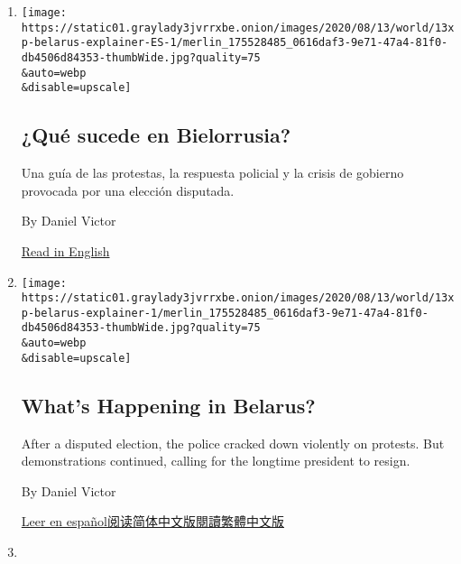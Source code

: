\begin{enumerate}
\def\labelenumi{\arabic{enumi}.}
\item
  \href{/es/2020/08/13/espanol/mundo/protestas-bielorrusia.html}{}

  \texttt{[image: https://static01.graylady3jvrrxbe.onion/images/2020/08/13/world/13xp-belarus-explainer-ES-1/merlin\_175528485\_0616daf3-9e71-47a4-81f0-db4506d84353-thumbWide.jpg?quality=75\\\&auto=webp\\\&disable=upscale]}

  \hypertarget{quuxe9-sucede-en-bielorrusia}{%
  \subsection{¿Qué sucede en
  Bielorrusia?}\label{quuxe9-sucede-en-bielorrusia}}

  Una guía de las protestas, la respuesta policial y la crisis de
  gobierno provocada por una elección disputada.

  By Daniel Victor

  \href{https://www.nytimes3xbfgragh.onion/2020/08/13/world/europe/belarus-protests-guide.html}{Read
  in English}
\item
  \href{/2020/08/13/world/europe/belarus-protests-guide.html}{}

  \texttt{[image: https://static01.graylady3jvrrxbe.onion/images/2020/08/13/world/13xp-belarus-explainer-1/merlin\_175528485\_0616daf3-9e71-47a4-81f0-db4506d84353-thumbWide.jpg?quality=75\\\&auto=webp\\\&disable=upscale]}

  \hypertarget{whats-happening-in-belarus}{%
  \subsection{What's Happening in
  Belarus?}\label{whats-happening-in-belarus}}

  After a disputed election, the police cracked down violently on
  protests. But demonstrations continued, calling for the longtime
  president to resign.

  By Daniel Victor

  \href{https://www.nytimes3xbfgragh.onion/es/2020/08/13/espanol/mundo/protestas-bielorrusia.html}{Leer
  en
  español}\href{https://cn.nytimes3xbfgragh.onion/world/20200818/belarus-protests-guide/}{阅读简体中文版}\href{https://cn.nytimes3xbfgragh.onion/world/20200818/belarus-protests-guide/zh-hant/}{閱讀繁體中文版}
\item
  \href{/live/2020/08/12/us/biden-vs-trump/a-good-bet-more-maya-rudolph-on-snl}{}


\end{enumerate}

